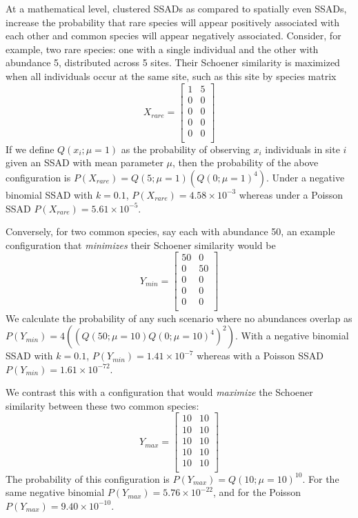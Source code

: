 \documentclass[
]{article}
\begin{document}
At a mathematical level, clustered SSADs as compared to spatially even
SSADs, increase the probability that rare species will appear positively
associated with each other and common species will appear negatively
associated. Consider, for example, two rare species: one with a single
individual and the other with abundance 5, distributed across 5 sites.
Their Schoener similarity is maximized when all individuals occur at the
same site, such as this site by species matrix \[
X_{rare} = \begin{bmatrix} 1 & 5 \\ 0 & 0 \\ 0 & 0 \\ 0 & 0 \\ 0 & 0 \\ \end{bmatrix}
\] If we define \(Q(x_i; \mu = 1)\) as the probability of observing
\(x_i\) individuals in site \(i\) given an SSAD with mean parameter
\(\mu\), then the probability of the above configuration is
\(P(X_{rare}) = Q(5; \mu = 1) \left(Q(0; \mu = 1)^{4}\right)\). Under a
negative binomial SSAD with \(k = 0.1\),
\(P(X_{rare}) = 4.58 \times 10^{-3}\) whereas under a Poisson SSAD
\(P(X_{rare}) = 5.61 \times 10^{-5}\).

Conversely, for two common species, say each with abundance 50, an
example configuration that \emph{minimizes} their Schoener similarity
would be \[
Y_{min} = \begin{bmatrix} 50 & 0 \\ 0 & 50 \\ 0 & 0 \\ 0 & 0 \\ 0 & 0 \\ \end{bmatrix}
\] We calculate the probability of any such scenario where no abundances
overlap as
\(P(Y_{min}) = 4 \left(\left(Q(50; \mu = 10) Q(0; \mu = 10)^{4}\right)^2\right)\).
With a negative binomial SSAD with \(k = 0.1\),
\(P(Y_{min}) = 1.41 \times 10^{-7}\) whereas with a Poisson SSAD
\(P(Y_{min}) = 1.61 \times 10^{-72}\).

We contrast this with a configuration that would \emph{maximize} the
Schoener similarity between these two common species: \[
Y_{max} = \begin{bmatrix} 10 & 10 \\ 10 & 10 \\ 10 & 10 \\ 10 & 10 \\ 10 & 10 \\ \end{bmatrix}
\] The probability of this configuration is
\(P(Y_{max}) = Q(10; \mu = 10)^{10}\). For the same negative binomial
\(P(Y_{max}) = 5.76 \times 10^{-22}\), and for the Poisson
\(P(Y_{max}) = 9.40 \times 10^{-10}\).
\end{document}
